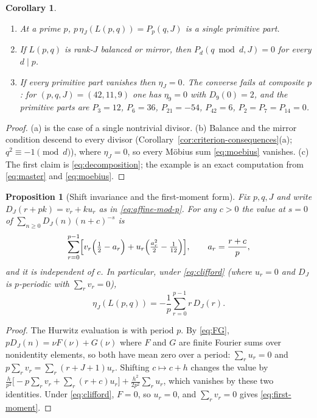 \documentclass[11pt]{article}
\newtheorem{proposition}[theorem]{Proposition}
\newtheorem{corollary}[theorem]{Corollary}
\theoremstyle{definition}
\begin{document}
\begin{corollary}
\label{cor:decomposition}
\begin{enumerate}[label=(\alph*)]
\item At a prime $p$, $p\,\eta_J(L(p,q))=P_p(q,J)$ is a single primitive
part.
\item If $L(p,q)$ is rank-$J$ balanced or mirror, then
$P_d(q\bmod d,J)=0$ for every $d\mid p$.
\item If every primitive part vanishes then $\eta_J=0$.  The converse
fails at composite $p$: for $(p,q,J)=(42,11,9)$ one has $\eta_9=0$ with
$D_9(0)=2$, and the primitive parts are $P_3=12$, $P_6=36$, $P_{21}=-54$,
$P_{42}=6$, $P_2=P_7=P_{14}=0$.
\end{enumerate}
\end{corollary}

\begin{proof}
(a) is the case of a single nontrivial divisor.  (b) Balance and the
mirror condition descend to every divisor
(Corollary~\ref{cor:criterion-consequences}(a); $q^2\equiv-1\pmod d$),
where $\eta_J=0$, so every M\"obius sum \eqref{eq:moebius} vanishes.
(c) The first claim is \eqref{eq:decomposition}; the example is an exact
computation from \eqref{eq:master} and \eqref{eq:moebius}.
\end{proof}

\begin{proposition}[Shift invariance and the first-moment form]
\label{prop:first-moment}
Fix $p,q,J$ and write $D_J(r+pk)=v_r+ku_r$ as in \eqref{eq:affine-mod-p}.
For any $c>0$ the value at $s=0$ of $\sum_{n\geq0}D_J(n)(n+c)^{-s}$ is
\[
 \sum_{r=0}^{p-1}\Bigl[v_r\Bigl(\tfrac12-a_r\Bigr)
 +u_r\Bigl(\tfrac{a_r^2}2-\tfrac1{12}\Bigr)\Bigr],\qquad a_r=\frac{r+c}p,
\]
and it is independent of $c$.  In particular, under
\eqref{eq:clifford} (where $u_r=0$ and $D_J$ is $p$-periodic with
$\sum_rv_r=0$),
\begin{equation}
 \eta_J(L(p,q))=-\frac1p\sum_{r=0}^{p-1}r\,D_J(r).
 \label{eq:first-moment}
\end{equation}
\end{proposition}

\begin{proof}
The Hurwitz evaluation is \cite[Prop.~4.1]{MahmoodP1Collection2026} with
period $p$.  By \eqref{eq:FG}, $pD_J(n)=\nu F(\nu)+G(\nu)$ where $F$ and
$G$ are finite Fourier sums over nonidentity elements, so both have mean
zero over a period: $\sum_ru_r=0$ and $p\sum_rv_r=\sum_r(r+J+1)u_r$.
Shifting $c\mapsto c+h$ changes the value by
$\frac h{p^2}\bigl[-p\sum_rv_r+\sum_r(r+c)u_r\bigr]+\frac{h^2}{2p^2}\sum_ru_r$,
which vanishes by these two identities.  Under \eqref{eq:clifford},
$F=0$, so $u_r=0$, and $\sum_rv_r=0$ gives \eqref{eq:first-moment}.
\end{proof}
\end{document}
